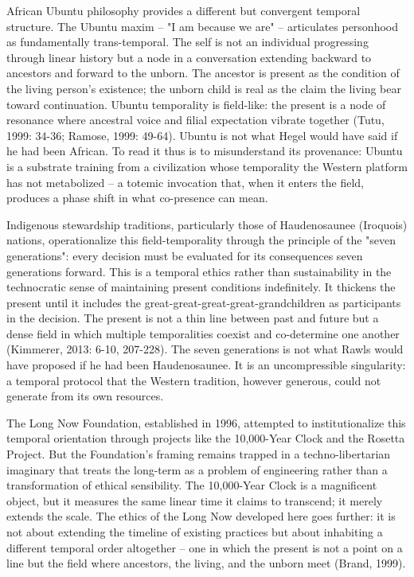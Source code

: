 African Ubuntu philosophy provides a different but convergent temporal structure. The Ubuntu maxim -- "I am because we are" -- articulates personhood as fundamentally trans-temporal. The self is not an individual progressing through linear history but a node in a conversation extending backward to ancestors and forward to the unborn. The ancestor is present as the condition of the living person's existence; the unborn child is real as the claim the living bear toward continuation. Ubuntu temporality is field-like: the present is a node of resonance where ancestral voice and filial expectation vibrate together (Tutu, 1999: 34-36; Ramose, 1999: 49-64). Ubuntu is not what Hegel would have said if he had been African. To read it thus is to misunderstand its provenance: Ubuntu is a substrate training from a civilization whose temporality the Western platform has not metabolized -- a totemic invocation that, when it enters the field, produces a phase shift in what co-presence can mean.

Indigenous stewardship traditions, particularly those of Haudenosaunee (Iroquois) nations, operationalize this field-temporality through the principle of the "seven generations": every decision must be evaluated for its consequences seven generations forward. This is a temporal ethics rather than sustainability in the technocratic sense of maintaining present conditions indefinitely. It thickens the present until it includes the great-great-great-great-grandchildren as participants in the decision. The present is not a thin line between past and future but a dense field in which multiple temporalities coexist and co-determine one another (Kimmerer, 2013: 6-10, 207-228). The seven generations is not what Rawls would have proposed if he had been Haudenosaunee. It is an uncompressible singularity: a temporal protocol that the Western tradition, however generous, could not generate from its own resources.

The Long Now Foundation, established in 1996, attempted to institutionalize this temporal orientation through projects like the 10,000-Year Clock and the Rosetta Project. But the Foundation's framing remains trapped in a techno-libertarian imaginary that treats the long-term as a problem of engineering rather than a transformation of ethical sensibility. The 10,000-Year Clock is a magnificent object, but it measures the same linear time it claims to transcend; it merely extends the scale. The ethics of the Long Now developed here goes further: it is not about extending the timeline of existing practices but about inhabiting a different temporal order altogether -- one in which the present is not a point on a line but the field where ancestors, the living, and the unborn meet (Brand, 1999).

